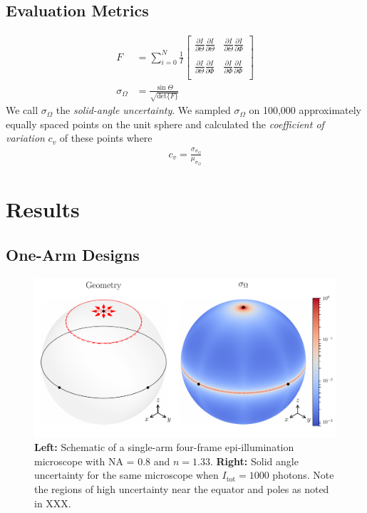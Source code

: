 \documentclass[10pt]{article}
\begin{document}
\subsection{Evaluation Metrics}
\begin{align}
  F &= \sum_{i=0}^N \frac{1}{I}
  \begin{bmatrix}
    \frac{\partial I}{\partial \Theta}\frac{\partial I}{\partial \Theta}&\frac{\partial I}{\partial \Theta}\frac{\partial I}{\partial \Phi}\\\\
    \frac{\partial I}{\partial \Theta}\frac{\partial I}{\partial \Phi}&\frac{\partial I}{\partial \Phi}\frac{\partial I}{\partial \Phi}\\    
  \end{bmatrix}\\
  \sigma_{\Omega} &= \frac{\sin\Theta}{\sqrt{\text{det}\{F\}}}
\end{align}
We call $\sigma_{\Omega}$ the \emph{solid-angle uncertainty}. 
We sampled $\sigma_{\Omega}$ on 100,000 approximately equally
spaced points on the unit sphere and calculated the \emph{coefficient of variation}
$c_v$ of these points where
\begin{align}
  c_v = \frac{\sigma_{\sigma_{\Omega}}}{\mu_{\sigma_{\Omega}}}
\end{align}

\section{Results}
\subsection{One-Arm Designs}
\begin{figure}[htbp]
\centering\includegraphics[width=\textwidth]{single-arm}
\caption{\textbf{Left:} Schematic of a single-arm four-frame epi-illumination
  microscope with NA = 0.8 and $n = 1.33$.  \textbf{Right:} Solid
  angle uncertainty for the same microscope when $I_{\text{tot}} = 1000$
  photons. Note the regions of high uncertainty near the equator and poles
  as noted in XXX.}
\end{figure}
\end{document}
